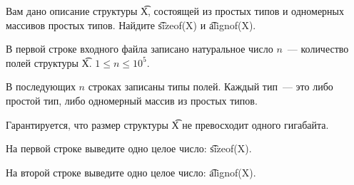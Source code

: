 Вам дано описание структуры \t{X}, состоящей из простых типов и одномерных массивов простых типов.
Найдите \t{sizeof(X)} и \t{alignof(X)}.

\InputFile

В первой строке входного файла записано натуральное число $n$~--- количество полей структуры \t{X}. $1 \le n \le 10^5$.

В последующих $n$ строках записаны типы полей. Каждый тип~--- это либо простой тип, либо одномерный массив из простых типов.

Гарантируется, что размер структуры \t{X} не превосходит одного гигабайта.

\OutputFile

На первой строке выведите одно целое число: \t{sizeof(X)}.

На второй строке выведите одно целое число: \t{alignof(X)}.

\SAMPLES
